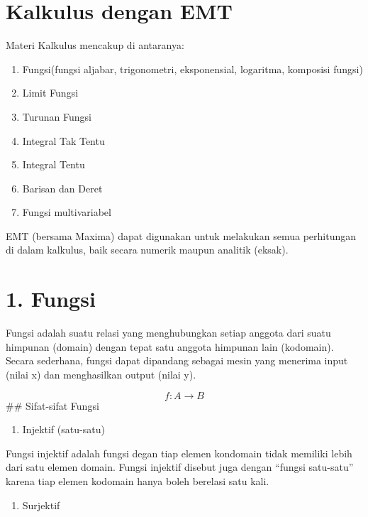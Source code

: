 \documentclass[
]{book}
\author{}
\date{}
\providecommand{\tightlist}{%
  \setlength{\itemsep}{0pt}\setlength{\parskip}{0pt}}
\begin{document}
\frontmatter

\mainmatter
\chapter{Kalkulus dengan EMT}\label{kalkulus-dengan-emt}

Materi Kalkulus mencakup di antaranya:

\begin{enumerate}
\def\labelenumi{\arabic{enumi}.}
\item
  Fungsi(fungsi aljabar, trigonometri, eksponensial, logaritma, komposisi fungsi)
\item
  Limit Fungsi
\item
  Turunan Fungsi
\item
  Integral Tak Tentu
\item
  Integral Tentu
\item
  Barisan dan Deret
\item
  Fungsi multivariabel
\end{enumerate}

EMT (bersama Maxima) dapat digunakan untuk melakukan semua perhitungan di dalam kalkulus, baik secara numerik maupun analitik (eksak).

\chapter{1. Fungsi}\label{fungsi}

Fungsi adalah suatu relasi yang menghubungkan setiap anggota dari suatu himpunan (domain) dengan tepat satu anggota himpunan lain (kodomain). Secara sederhana, fungsi dapat dipandang sebagai mesin yang menerima input (nilai x) dan menghasilkan output (nilai y).

\[f: A \to B\]\#\# Sifat-sifat Fungsi

\begin{enumerate}
\def\labelenumi{\arabic{enumi}.}
\tightlist
\item
  Injektif (satu-satu)
\end{enumerate}

Fungsi injektif adalah fungsi degan tiap elemen kondomain tidak memiliki lebih dari satu elemen domain. Fungsi injektif disebut juga dengan ``fungsi satu-satu'' karena tiap elemen kodomain hanya boleh berelasi satu kali.

\begin{enumerate}
\def\labelenumi{\arabic{enumi}.}
\setcounter{enumi}{1}
\tightlist
\item
  Surjektif
\end{enumerate}
\end{document}
